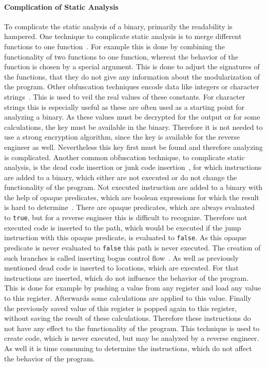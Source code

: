 \documentclass[10pt,twoside,a4paper,bibliography=totoc]{scrbook}
\newcommand{\code}[1]{\texttt{#1}}
\begin{document}
\paragraph{Complication of Static Analysis}
To complicate the static analysis of a binary, primarily the readability is hampered.
One technique to complicate static analysis is to merge different functions to 
one function~\cite{obfubo}.
For example this is done by combining the functionality of two functions to one function,
whereat the behavior of the function is chosen by a special argument.
This is done to adjust the signatures of the functions, that they do not give 
any information about the modularization of the program.
Other obfuscation techniques encode data like integers or character strings~\cite{obfubo}.
This is used to veil the real values of these constants.
For character strings this is especially useful as these are often used as a 
starting point for analyzing a binary.
As these values must be decrypted for the output or for some calculations, 
the key must be available in the binary. 
Therefore it is not needed to use a strong encryption algorithm, since the 
key is available for the reverse engineer as well. 
Nevertheless this key first must be found and therefore analyzing is complicated.
Another common obfuscation technique, to complicate static analysis, is the dead code insertion or 
junk code insertion~\cite{obfsurvy}, 
for which instructions are added to a binary, which either are not executed or 
do not change the functionality of the program. 
Not executed instruction are added to a binary with the help of opaque 
predicates, which are boolean expressions for which the result is hard to determine~\cite{obfubo}.
There are opaque predicates, which are always evaluated to \code{true}, but for 
a reverse engineer this is difficult to recognize.
Therefore not executed code is inserted to the path, which would be executed if the jump
instruction with this opaque predicate, is evaluated to \code{false}.
As this opaque predicate is never evaluated to \code{false} this path is never
executed.
The creation of such branches is called inserting bogus control flow~\cite{obfubo}.
As well as previously mentioned dead code is inserted to locations, which are executed. 
For that instructions are inserted, which do not influence the behavior of the program.
This is done for example by pushing a value from any register and load any value 
to this register.
Afterwards some calculations are applied to this value.
Finally the previously saved value of this register is popped again to this register, 
without saving the result of these calculations.
Therefore these instructions do not have any effect to the functionality of the 
program.
This technique is used to create code, which is never executed, but may be analyzed 
by a reverse engineer. 
As well it is time consuming to determine the instructions, which do not affect the 
behavior of the program.
\end{document}
